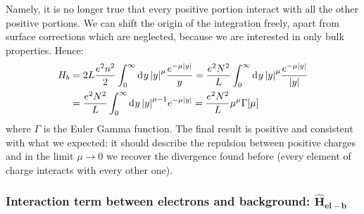 \documentclass[11pt, a4paper, twoside, openright]{article}
\begin{document}
Namely, it is no longer true that every positive portion interact with all the other positive portions. We can shift the origin of the integration freely, apart from surface corrections which are neglected, because we are interested in only bulk properties.
Hence:
\begin{equation}
\begin{split}
H_b  &= 2 L \frac{e^2 n^2}{2} \int_{0}^{\infty} \dd[]{y} \abs{y} ^\mu \frac{e^{- \mu \abs{y} }}{y}
=   \frac{ e^2 N^2}{L} \int_{0}^{\infty} \dd[]{y} \abs{y} ^\mu \frac{e^{- \mu \abs{y} }}{\abs{y} } \\
&=  \frac{ e^2 N^2}{L } \int_{0}^{\infty} \dd[]{y} \abs{y} ^{\mu-1} e^{- \mu \abs{y} }
=  \frac{ e^2 N^2}{L }  \mu^\mu \Gamma [\mu]
\end{split}
\end{equation}
where \( \Gamma  \) is the Euler Gamma function.
The final result is positive and consistent with what we expected: it should describe the repulsion between positive charges and in the limit \( \mu  \rightarrow 0 \) we recover the divergence found before (every element of charge interacts with every other one).









\subsubsection*{Interaction term between electrons and background: \( \mathbf{\hat{H}_{el-b} } \) }
\end{document}

